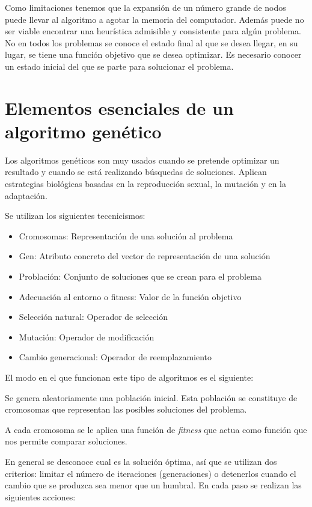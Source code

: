 \documentclass[12pt]{article}
\begin{document}
Como limitaciones tenemos que la expansión de un número grande de
nodos puede llevar al algoritmo a agotar la memoria del
computador. Además puede no ser viable encontrar una heurística
admisible y consistente para algún problema. No en todos los problemas
se conoce el estado final al que se desea llegar, en su lugar, se
tiene una función objetivo que se desea optimizar. Es necesario
conocer un estado inicial del que se parte para solucionar el problema.

\section{Elementos esenciales de un algoritmo genético}

Los algoritmos genéticos son muy usados cuando se pretende optimizar
un resultado y cuando se está realizando búsquedas de
soluciones. Aplican estrategias biológicas basadas en la reproducción
sexual, la mutación y en la adaptación.

Se utilizan los siguientes teccnicismos:

\begin{itemize}
\item Cromosomas: Representación de una solución al problema
\item Gen: Atributo concreto del vector de representación de una solución
\item Problación: Conjunto de soluciones que se crean para el problema
\item Adecuación al entorno o fitness: Valor de la función objetivo
\item Selección natural: Operador de selección
\item Mutación: Operador de modificación
\item Cambio generacional: Operador de reemplazamiento
\end{itemize}

El modo en el que funcionan este tipo de algoritmos es el siguiente:

Se genera aleatoriamente una población inicial. Esta población se
constituye de cromosomas que representan las posibles soluciones del
problema.

A cada cromosoma se le aplica una función de \textit{fitness} que
actua como función que nos permite comparar soluciones.

En general se desconoce cual es la solución óptima, así que se
utilizan dos criterios: limitar el número de iteraciones
(generaciones) o detenerlos cuando el cambio que se produzca sea menor
que un humbral. En cada paso se realizan las siguientes acciones:
\end{document}
